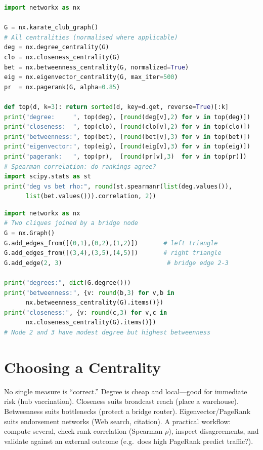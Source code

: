 \begin{lstlisting}[language=Python, caption={Centrality zoo on Zachary karate club: degree, closeness, betweenness, eigenvector, PageRank.}, label={lst:centrality-zoo}]
import networkx as nx

G = nx.karate_club_graph()
# All centralities (normalised where applicable)
deg = nx.degree_centrality(G)
clo = nx.closeness_centrality(G)
bet = nx.betweenness_centrality(G, normalized=True)
eig = nx.eigenvector_centrality(G, max_iter=500)
pr  = nx.pagerank(G, alpha=0.85)

def top(d, k=3): return sorted(d, key=d.get, reverse=True)[:k]
print("degree:     ", top(deg), [round(deg[v],2) for v in top(deg)])
print("closeness:  ", top(clo), [round(clo[v],2) for v in top(clo)])
print("betweenness:", top(bet), [round(bet[v],3) for v in top(bet)])
print("eigenvector:", top(eig), [round(eig[v],3) for v in top(eig)])
print("pagerank:   ", top(pr),  [round(pr[v],3)  for v in top(pr)])
# Spearman correlation: do rankings agree?
import scipy.stats as st
print("deg vs bet rho:", round(st.spearmanr(list(deg.values()),
      list(bet.values())).correlation, 2))
\end{lstlisting}

\begin{lstlisting}[language=Python, caption={Betweenness reveals bridges: star-of-stars where degree misleads.}, label={lst:bridge-demo}]
import networkx as nx
# Two cliques joined by a bridge node
G = nx.Graph()
G.add_edges_from([(0,1),(0,2),(1,2)])       # left triangle
G.add_edges_from([(3,4),(3,5),(4,5)])       # right triangle
G.add_edge(2, 3)                             # bridge edge 2-3

print("degrees:", dict(G.degree()))
print("betweenness:", {v: round(b,3) for v,b in
      nx.betweenness_centrality(G).items()})
print("closeness:", {v: round(c,3) for v,c in
      nx.closeness_centrality(G).items()})
# Node 2 and 3 have modest degree but highest betweenness
\end{lstlisting}

\section{Choosing a Centrality}
\label{sec:choosing}
No single measure is ``correct.'' Degree is cheap and local---good for immediate risk (hub vaccination). Closeness suits broadcast reach (place a warehouse). Betweenness suits bottlenecks (protect a bridge router). Eigenvector/PageRank suits endorsement networks (Web search, citation). A practical workflow: compute several, check rank correlation (Spearman $\rho$), inspect disagreements, and validate against an external outcome (e.g.\ does high PageRank predict traffic?).

